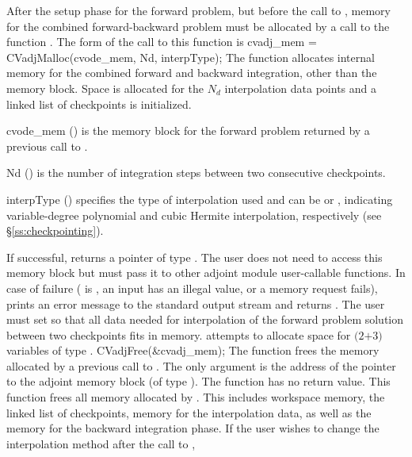 After the setup phase for the forward problem, but before the call
to , memory for the combined forward-backward problem must be
allocated by a call to the function .
The form of the call to this function is
{
  cvadj\_mem = CVadjMalloc(cvode\_mem, Nd, interpType);
}
{
  The function  allocates internal memory for the combined
  forward and backward integration, other than the {\cvodes} memory block. 
  Space is allocated for the $N_d$ interpolation data points and a linked 
  list of checkpoints is initialized.
}
{
  \begin{args}[interpType]
  \item[cvode\_mem] () 
    is the {\cvodes} memory block for the forward problem
    returned by a previous call to .
  \item[Nd] () 
    is the number of integration steps between two consecutive checkpoints.
  \item[interpType] ()
    specifies the type of interpolation used and can be 
    or , indicating variable-degree polynomial and cubic Hermite
    interpolation, respectively (see \S\ref{ss:checkpointing}).
  \end{args}
}
{
  If successful,  returns a pointer of type . The user
  does not need to access this memory block but must pass it to other adjoint module
  user-callable functions. In case of failure ( is , an input
  has an illegal value, or a memory request fails),  prints an error
  message to the standard output stream  and returns .
}
{
  The user must set  so that all data needed for interpolation of the 
  forward problem solution between two checkpoints fits in memory. 
  attempts to allocate space for $(2$$+3)$ variables of type .
}
{
  CVadjFree(\&cvadj\_mem);
}
{
  The function  frees the memory allocated by
  a previous call to .
}
{
  The only argument is the address of the pointer to the adjoint memory 
  block (of type ).
}
{
  The function  has no return value.
}
{
  This function frees all memory allocated by . This includes workspace memory, 
  the linked list of checkpoints, memory for the interpolation data, as well as the {\cvodes} memory 
  for the backward integration phase.
}
If the user wishes to change the interpolation method after the call to ,

